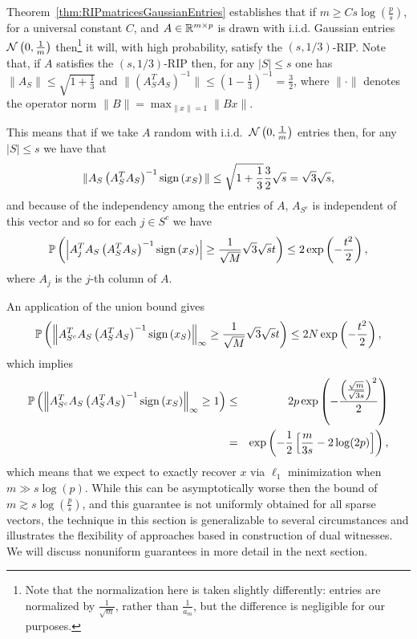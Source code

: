 Theorem~\ref{thm:RIPmatricesGaussianEntries} establishes that if $m \geq Cs\log\left(\frac{p}s\right)$, for a universal constant $C$, and $A \in \mathbb{R}^{m\times p}$ is drawn with i.i.d. Gaussian entries $\mathcal{N}\left(0,\frac1m\right)$ then\footnote{Note that the normalization here is taken slightly differently: entries are normalized by $\frac1{\sqrt{m}}$, rather than $\frac{1}{a_m}$, but the difference is negligible for our purposes.} it will, with high probability, satisfy the $(s,1/3)$-RIP. Note that, if $A$ satisfies the $(s,1/3)$-RIP then, for any $|S|\leq s$ one has $\|A_S\| \leq \sqrt{1+\frac13}$ and $\|\left(A_S^TA_S\right)^{-1}\| \leq \left(1-\frac13\right)^{-1} = \frac32$, where $\|\cdot\|$ denotes the operator norm $\|B\| = \max_{\|x\|=1}\|Bx\|$.

This means that if we take $A$ random with i.i.d.\ $\mathcal{N}\left(0,\frac1m\right)$ entries then, for any $|S|\leq s$ we have that
\[
\| A_S \left( A_S^TA_S \right)^{-1} \operatorname{sign}\left(x_S\right) \| \leq \sqrt{1+\frac13} \frac32\sqrt{s} = \sqrt{3}\sqrt{s},
\]
and because of the independency among the entries of $A$, $A_{S^c}$ is independent of this vector and so for each $j\in S^c$ we have
\[
{\mathbb{P}} \left(  \left| A_{j}^T A_S \left( A_S^TA_S \right)^{-1} \operatorname{sign}\left(x_S\right) \right| \geq \frac1{\sqrt{M}}\sqrt{3}\sqrt{s} t \right)  \leq 2\exp\left(-\frac{t^2}2\right),
\]
where $A_j$ is the $j$-th column of $A$.

An application of the union bound gives
\[
{\mathbb{P}} \left(  \left\| A_{S^c}^T A_S \left( A_S^TA_S \right)^{-1} \operatorname{sign}\left(x_S\right) \right\|_\infty \geq \frac1{\sqrt{M}}\sqrt{3}\sqrt{s} t  \right)  \leq 2N\exp\left(-\frac{t^2}2\right),
\]
which implies
\begin{eqnarray*}
{\mathbb{P}} \left(  \left\| A_{S^c}^T A_S \left( A_S^TA_S \right)^{-1} \operatorname{sign}\left(x_S\right) \right\|_\infty \geq 1  \right) & \leq & 2p\exp\left(-\frac{\left( \frac{\sqrt{m}}{\sqrt{3s}} \right)^2}2\right) \\ &=& \exp\left(- \frac12\left[ \frac{m}{3s} - 2\log(2p) \right] \right),
\end{eqnarray*}
which means that we expect to exactly recover $x$ via $\ell_1$ minimization when $m \gg s\log(p)$. While this can be asymptotically worse then the bound of $m \gtrsim s\log\left(\frac{p}s\right)$, and this guarantee is not uniformly obtained for all sparse vectors, the technique in this section is generalizable to several circumstances and illustrates the flexibility of approaches based in construction of dual witnesses. We will discuss nonuniform guarantees in more detail in the next section.


